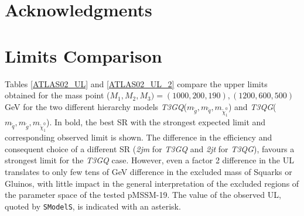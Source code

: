 \documentclass[a4paper,11pt]{article}
\newcommand{\SMO}{\texttt{SModelS\xspace}}
\begin{document}
\section*{Acknowledgments}
%


\clearpage
\appendix
%
\iffalse
\section{Limits Comparison}\label{app:ul}
Tables \ref{ATLAS02_UL} and \ref{ATLAS02_UL_2} compare the upper limits obtained for the mass point ($M_1,M_2,M_3) = (1000,200,190),(1200,600,500)$ GeV for the two different hierarchy models \textit{T3GQ}($m_{\tilde g}, m_{\tilde q}, m_{\tilde \chi _1 ^0 }$) and \textit{T3QG}($m_{\tilde q}, m_{\tilde g}, m_{\tilde \chi _1 ^0 }$). In bold, the best SR with the strongest expected limit and corresponding observed limit is shown. The difference in the efficiency and consequent choice of a different SR (\textit{2jm} for \textit{T3GQ} and \textit{2jt} for \textit{T3QG}), favours a strongest limit for the \textit{T3GQ} case. However, even a factor 2 difference in the UL translates to only few tens of GeV difference in the excluded mass of Squarks or Gluinos, with little impact in the general interpretation of the excluded regions of the parameter space of the tested pMSSM-19. The value of the observed UL, quoted by \SMO, is indicated with an asterisk. 
\end{document}
